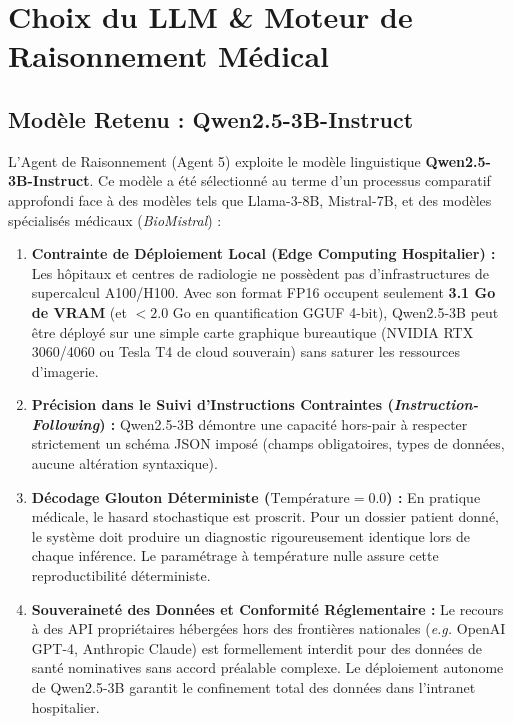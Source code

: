 \documentclass[11pt,a4paper]{article}
\begin{document}
\section{Choix du LLM \& Moteur de Raisonnement Médical}
\label{sec:choice_of_llm}

\subsection{Modèle Retenu : Qwen2.5-3B-Instruct}
L'Agent de Raisonnement (Agent 5) exploite le mod\`ele linguistique \textbf{Qwen2.5-3B-Instruct}. Ce mod\`ele a \'et\'e s\'electionn\'e au terme d'un processus comparatif approfondi face \`a des mod\`eles tels que Llama-3-8B, Mistral-7B, et des mod\`eles sp\'ecialis\'es m\'edicaux (\textit{BioMistral}) :

\begin{enumerate}
    \item \textbf{Contrainte de Déploiement Local (Edge Computing Hospitalier) :} Les h\^opitaux et centres de radiologie ne poss\`edent pas d'infrastructures de supercalcul A100/H100. Avec son format FP16 occupent seulement \textbf{3.1 Go de VRAM} (et $<2.0$ Go en quantification GGUF 4-bit), Qwen2.5-3B peut \^etre d\'eploy\'e sur une simple carte graphique bureautique (NVIDIA RTX 3060/4060 ou Tesla T4 de cloud souverain) sans saturer les ressources d'imagerie.
    \item \textbf{Précision dans le Suivi d'Instructions Contraintes (\textit{Instruction-Following}) :} Qwen2.5-3B d\'emontre une capacit\'e hors-pair \`a respecter strictement un sch\'ema JSON impos\'e (champs obligatoires, types de donn\'ees, aucune alt\'eration syntaxique).
    \item \textbf{Décodage Glouton Déterministe ($\text{Température} = 0.0$) :} En pratique m\'edicale, le hasard stochastique est proscrit. Pour un dossier patient donn\'e, le syst\`eme doit produire un diagnostic rigoureusement identique lors de chaque inf\'erence. Le param\'etrage \`a temp\'erature nulle assure cette reproductibilit\'e d\'eterministe.
    \item \textbf{Souveraineté des Données et Conformité Réglementaire :} Le recours \`a des API propri\'etaires h\'eberg\'ees hors des fronti\`eres nationales (\textit{e.g.} OpenAI GPT-4, Anthropic Claude) est formellement interdit pour des donn\'ees de sant\'e nominatives sans accord pr\'ealable complexe. Le d\'eploiement autonome de Qwen2.5-3B garantit le confinement total des donn\'ees dans l'intranet hospitalier.
\end{enumerate}
\end{document}
